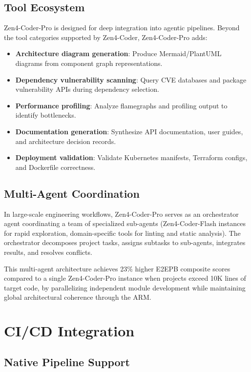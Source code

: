 \documentclass[11pt,a4paper]{article}
\begin{document}
\subsection{Tool Ecosystem}

Zen4-Coder-Pro is designed for deep integration into agentic pipelines. Beyond the tool categories supported by Zen4-Coder, Zen4-Coder-Pro adds:

\begin{itemize}
  \item \textbf{Architecture diagram generation}: Produce Mermaid/PlantUML diagrams from component graph representations.
  \item \textbf{Dependency vulnerability scanning}: Query CVE databases and package vulnerability APIs during dependency selection.
  \item \textbf{Performance profiling}: Analyze flamegraphs and profiling output to identify bottlenecks.
  \item \textbf{Documentation generation}: Synthesize API documentation, user guides, and architecture decision records.
  \item \textbf{Deployment validation}: Validate Kubernetes manifests, Terraform configs, and Dockerfile correctness.
\end{itemize}

\subsection{Multi-Agent Coordination}

In large-scale engineering workflows, Zen4-Coder-Pro serves as an orchestrator agent coordinating a team of specialized sub-agents (Zen4-Coder-Flash instances for rapid exploration, domain-specific tools for linting and static analysis). The orchestrator decomposes project tasks, assigns subtasks to sub-agents, integrates results, and resolves conflicts.

This multi-agent architecture achieves 23\% higher E2EPB composite scores compared to a single Zen4-Coder-Pro instance when projects exceed 10K lines of target code, by parallelizing independent module development while maintaining global architectural coherence through the ARM.

\section{CI/CD Integration}

\subsection{Native Pipeline Support}
\end{document}
